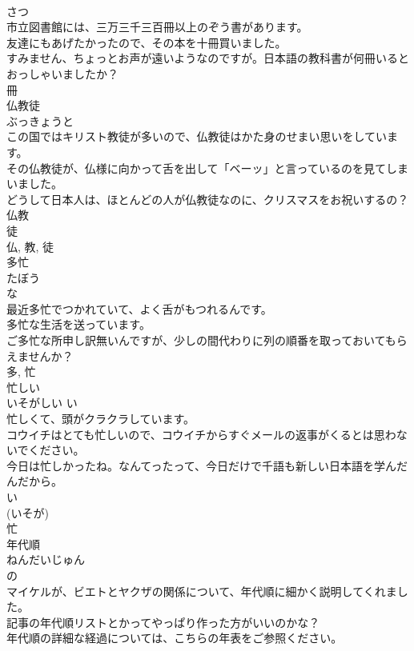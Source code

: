 \documentclass[8pt]{extreport}
\begin{document}
\begin{CJK}{UTF8}{min}
\\	さつ	
\\	市立図書館には、三万三千三百冊以上のぞう書があります。	
\\	友達にもあげたかったので、その本を十冊買いました。	
\\	すみません、ちょっとお声が遠いようなのですが。日本語の教科書が何冊いるとおっしゃいましたか？	
\\	冊	
\\	仏教徒	
\\	ぶっきょうと	
\\	この国ではキリスト教徒が多いので、仏教徒はかた身のせまい思いをしています。	
\\	その仏教徒が、仏様に向かって舌を出して「ベーッ」と言っているのを見てしまいました。	
\\	どうして日本人は、ほとんどの人が仏教徒なのに、クリスマスをお祝いするの？	
\\	仏教 
\\	徒 
\\	仏, 教, 徒	
\\	多忙	
\\	たぼう	
\\	な 
\\	最近多忙でつかれていて、よく舌がもつれるんです。	
\\	多忙な生活を送っています。	
\\	ご多忙な所申し訳無いんですが、少しの間代わりに列の順番を取っておいてもらえませんか？	
\\	多, 忙	
\\	忙しい	
\\	いそがしい	い 
\\	忙しくて、頭がクラクラしています。	
\\	コウイチはとても忙しいので、コウイチからすぐメールの返事がくるとは思わないでください。	
\\	今日は忙しかったね。なんてったって、今日だけで千語も新しい日本語を学んだんだから。	
\\	い 
\\	(いそが) 
\\	忙	
\\	年代順	
\\	ねんだいじゅん	
\\	の 
\\	マイケルが、ビエトとヤクザの関係について、年代順に細かく説明してくれました。	
\\	記事の年代順リストとかってやっぱり作った方がいいのかな？	
\\	年代順の詳細な経過については、こちらの年表をご参照ください。	

\end{CJK}
\end{document}
